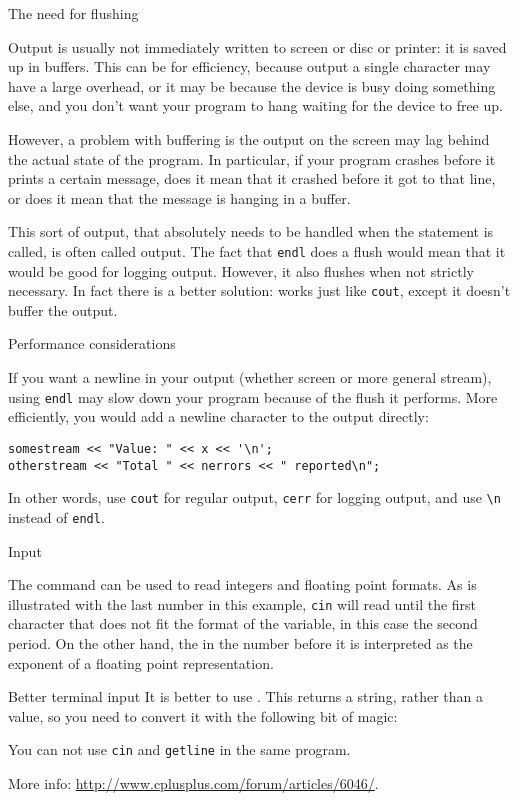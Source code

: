  {The need for flushing}

Output is usually not immediately written to screen or disc or
printer: it is saved up in buffers. This can be for efficiency,
because output a single character may have a large overhead, or it may
be because the device is busy doing something else, and you don't want
your program to hang waiting for the device to free up.

However, a problem with buffering is the output on the screen may lag
behind the actual state of the program. In particular, if your program
crashes before it prints a certain message, does it mean that it
crashed before it got to that line, or does it mean that the message
is hanging in a buffer.

This sort of output, that absolutely needs to be handled when the
statement is called, is often called  output.
The fact that \lstinline{endl} does a flush would mean that it would be good
for logging output. However, it also flushes when not strictly
necessary. In fact there is a better solution:
 works just like \lstinline{cout}, except it
doesn't buffer the output.

 {Performance considerations}

If you want a newline in your output (whether screen or more general stream),
using \lstinline+endl+ may slow down your program because of the flush
it performs.
More efficiently, you would add a newline character to the output directly:
\begin{lstlisting}
somestream << "Value: " << x << '\n';
otherstream << "Total " << nerrors << " reported\n";
\end{lstlisting}
In other words, use \lstinline{cout} for regular output, \lstinline{cerr} for logging
output, and use \verb+\n+ instead of \lstinline{endl}.

 {Input}
\label{sec:termin}

The  command can be used to read integers
and floating point formats.
%
%
As is illustrated with the last number in this example,
\lstinline{cin} will read until the first character that does not
fit the format of the variable, in this case the second period.
On the other hand, the  in the number before it is 
interpreted as the exponent of a floating point representation.

\begin{block}{Better terminal input}
  \label{sl:getline}
  It is better to use . This returns a string,
  rather than a value, so you need to convert it with the following bit
  of magic:

  You can not use \lstinline{cin} and \lstinline{getline} in the same program.

  More info:
  \url{http://www.cplusplus.com/forum/articles/6046/}.

\end{block}

